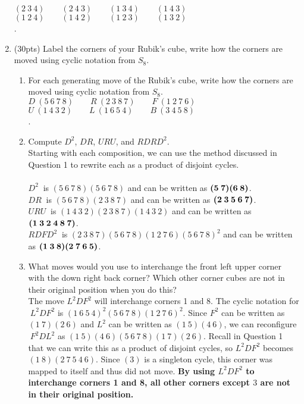 \documentclass[16pt]{article}
\begin{document}
\begin{enumerate}
\begingroup
\centering
$(2\:3\:4) \qquad (2\:4\:3)\qquad (1\:3\:4)\qquad (1\:4\:3)$\\
$(1\:2\:4)\qquad (1\:4\:2)\qquad (1\:2\:3)\qquad (1\:3\:2)$\\.\\
\endgroup 


\item(30pts) Label the corners of your Rubik's cube, write how the corners are moved using cyclic notation from $S_8$.\\
\begin{enumerate}
\item For each generating move of the Rubik's cube, write how the corners are moved using cyclic notation from $S_8$.\\

\begingroup
\centering
$D\>(5\:6\:7\:8)\qquad R \>(2\:3\:8\:7) \qquad F\>(1\:2\:7\:6)$\\
$U \>(1\:4\:3\:2) \qquad L \>(1\:6\:5\:4) \qquad B\>(3\:4\:5\:8)$\\.\\
\endgroup


\item Compute $D^2$, $DR$, $URU$, and $RDRD^2$.\\

Starting with each composition, we can use the method discussed in Question 1 to rewrite each as a product of disjoint cycles. \\\\$D^2\>$ is $(5\:6\:7\:8)(5\:6\:7\:8)$ and can be written as $\textbf{(5\:7)(6\:8)}$. \\$DR\>$ is $(5\:6\:7\:8)(2\:3\:8\:7)$ and can be written as $\textbf{(2\:3\:5\:6\:7)}$. \\$URU\>$ is $(1\:4\:3\:2)(2\:3\:8\:7)(1\:4\:3\:2)$ and can be written as $\textbf{(1\:3\:2\:4\:8\:7)}$. \\$RDFD^2\>$ is $(2\:3\:8\:7)(5\:6\:7\:8)(1\:2\:7\:6)(5\:6\:7\:8)^2$ and can be written as $\textbf{(1\:3\:8)(2\:7\:6\:5)}$.\\

\item What moves would you use to interchange the front left upper corner with the down right back corner? Which other corner cubes are not in their original position when you do this?\\

The move $L^2DF^2$ will interchange corners 1 and 8. The cyclic notation for $\>L^2DF^2$ is $(1\:6\:5\:4)^2(5\:6\:7\:8)(1\:2\:7\:6)^2$. Since $F^2$ can be written as $(1\:7)(2\:6)$ and $L^2$ can be written as $(1\:5)(4\:6)$, we can reconfigure $\>F^2DL^2$ as $(1\:5)(4\:6)(5\:6\:7\:8)(1\:7)(2\:6)$. Recall in Question 1 that we can write this as a product of disjoint cycles, so $L^2DF^2$ becomes $(1\:8)(2\:7\:5\:4\:6)$. Since $(3)$ is a singleton cycle, this corner was mapped to itself and thus did not move. \textbf{By using $L^2DF^2$ to interchange corners 1 and 8, all other corners except $3$ are not in their original position.}\\

\end{enumerate}
\end{enumerate}
\end{document}
